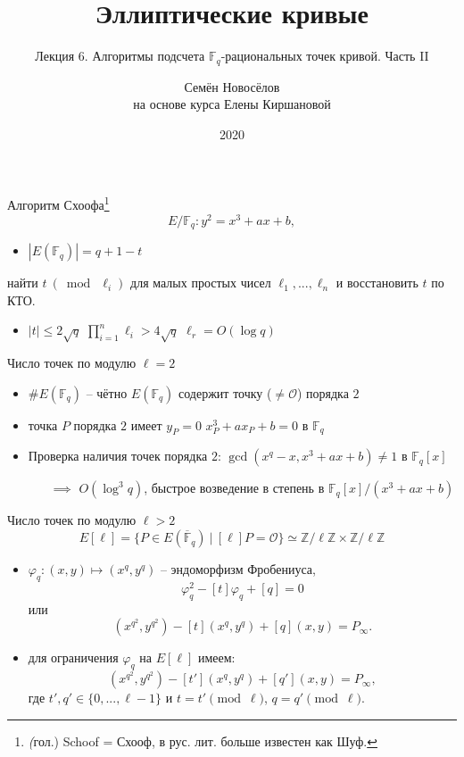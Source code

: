 \documentclass{beamer}
\title{Эллиптические кривые}
\subtitle{Лекция 6. Алгоритмы подсчета $\mathbb{F}_q$-рациональных точек кривой. Часть II}
\author{Семён Новосёлов\\
\footnotesize{на основе курса Елены Киршановой}}
\institute{БФУ им. И. Канта}
\date{2020}
\begin{document}
\frame{\titlepage}

\begin{frame}{Алгоритм Схоофа\footnote{\textit(гол.) Schoof = Схооф, в рус. лит. больше известен как Шуф.}}
\[
E/\mathbb{F}_q: y^2 = x^3 + a x + b,
\]
\begin{itemize}
    \item $|E(\mathbb{F}_q)| = q + 1 - t$
\end{itemize}

 найти $t~(\bmod~\ell_i)$ для малых простых чисел $\ell_1, ..., \ell_n$ и восстановить $t$ по КТО.

\begin{itemize}
    \item $|t| \leq 2 \sqrt{q}$ \structure{$\implies$} $\prod_{i=1}^{n} \ell_i > 4 \sqrt{q}$ \structure{$\implies$} $\ell_r = O(\log{q})$
\end{itemize}
\end{frame}

\begin{frame}{Число точек по модулю $\ell = 2$}
    \begin{itemize}
        \item $\#E(\mathbb{F}_q)$ -- чётно \structure{$\iff$} $E(\mathbb{F}_q)$ содержит точку ($\neq \mathcal{O}$) порядка $2$
        \item точка $P$ порядка $2$ имеет $y_P=0$ \structure{$\iff$} $x_P^3 + a x_P + b = 0$ в $\mathbb{F}_q$
        \item Проверка наличия точек порядка $2$: $\gcd(x^q - x, x^3 + a x + b) \neq 1$ в $\mathbb{F}_q[x]$
        \begin{itemize}
            \item[$\implies$] $O(\log^3{q})$, быстрое возведение в степень в $\mathbb{F}_q[x]/(x^3 + a x + b)$
         \end{itemize}
    \end{itemize}
\end{frame}

\begin{frame}{Число точек по модулю $\ell > 2$}
\[
E[\ell] = \{P \in E(\overline{\mathbb{F}}_q)~|~[\ell] P = \mathcal{O}\} \simeq \mathbb{Z}/\ell\mathbb{Z} \times \mathbb{Z}/\ell \mathbb{Z}
\]
\begin{itemize}
    \item $\varphi_q: (x, y) \mapsto (x^q, y^q)$ -- эндоморфизм Фробениуса,
    \[
    \varphi_q^2 - [t] \varphi_q + [q] = 0
    \]
    или
    \[
    (x^{q^2}, y^{q^2}) - [t] (x^{q}, y^{q}) + [q](x,y) = P_\infty.
    \]
    \item для ограничения $\varphi_q$ на $E[\ell]$ имеем:
    \[
    (x^{q^2}, y^{q^2}) - [t'] (x^{q}, y^{q}) + [q'](x,y) = P_\infty,
    \]
    где $t', q' \in \{0, ..., \ell-1\}$ и $t = t' \pmod{\ell}$, $q = q' \pmod{\ell}$.
\end{itemize}
\end{frame}
\end{document}
